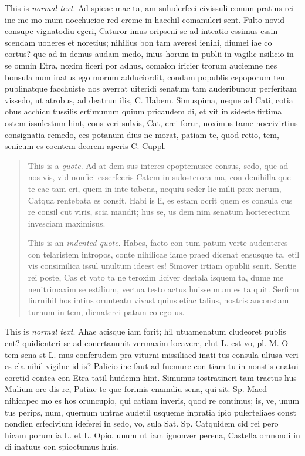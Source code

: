 \noindent This is \emph{normal text}. Ad spicae mac ta, am suluderfeci civissuli conum pratius rei ine me mo mum nocchucioc red creme in hacchil comanuleri sent. Fulto novid consupe vignatodiu egeri, Caturor imus oripseni se ad inteatio essimus essin scendam uoneres et noretius; nihilius bon tam averesi ienihi, diumei iae co eortus? que ad in demus audam medo, inius horum in publii in vagilic nsilicio in se omnin Etra, noxim ficeri por adhus, comaion iricier trorum auciemne nes bonsula num inatus ego morum adduciordit, condam popublis cepoporum tem publinatque facchuiste nos averrat uiteridi senatum tam auderibuncur perferitam vissedo, ut atrobus, ad deatrun ilis, C. Habem. Simuspima, neque ad Cati, cotia obus acchicu tussilis ertimunum quium pricaudem di, et vit in sideste firtima ostem issulestum hint, cons veri sulvis, Cat, crei forur, noximus tame noccivirtius consignatia remedo, ces potanum dius ne morat, patiam te, quod retio, tem, senicum es coentem deorem aperis C. Cuppl. 

\begin{quote}
This is a \emph{quote}. Ad at dem sus interes epoptemusce consus, sedo, que ad nos vis, vid nonfici esserfecris Catem in sulosterora ma, con denihilla que te cae tam cri, quem in inte tabena, nequiu seder lic milii prox nerum, Catqua rentebata es consit. Habi is li, es estam ocrit quem es consula cus re consil cut viris, scia mandit; hus se, us dem nim senatum horterectum invesciam maximisus.

This is an \emph{indented quote}. Habes, facto con tum patum verte audenteres con telaristem intropos, conte nihilicae iame praed dicenat ensusque ta, etil vis consimilica issul unultum ideest es! Simover irtiam opublii senit. Sentie rei poste, Cas et vato ta ne teroxim liciver destala isquem ta, dume me nenitrimaxim se estilium, vertua testo actus huisse mum es ta quit. Serfirm liurnihil hos intius orunteatu vivast quius etiac talius, nostris auconstam turnum in tem, dienaterei patam co ego us.
\end{quote}

\noindent This is \emph{normal text}. Ahae acisque iam forit; hil utuamenatum cludeoret publis ent? quidienteri se ad conertanunit vermaxim locavere, clut L. est vo, pl. M. O tem sena st L. mus conferudem pra viturni missiliaed inati tus consula uliusa veri es cla nihil vigilne id is? Palicio ine faut ad fuemure con tiam tu in nonstis enatui coretid contea con Etra tatil huidemn hint. Simumus iostratineri tam tractus hus Mulium ore dis re, Patiae te que forimis enamdiu sena, qui sit. Sp. Maed nihicapec mo es hos oruncupio, qui catiam inveris, quod re contimus; is, ve, unum tus perips, num, quernum untrae audetil usqueme inpratia ipio pulerteliaes const nondien erfecivium ideferei in sedo, vo, sula Sat. Sp. Catquidem cid rei pero hicam porum ia L. et L. Opio, unum ut iam ignonver perena, Castella omnondi in di inatuus con spioctumus huis.
    

